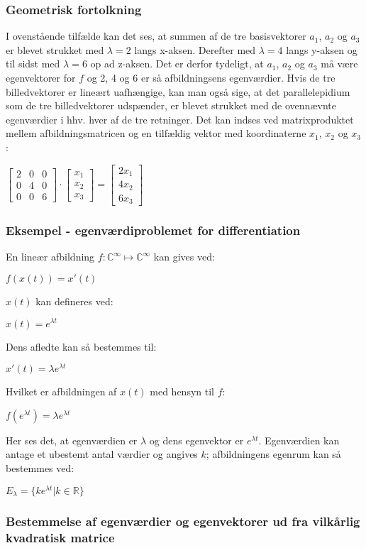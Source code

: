 \documentclass{article}
\newcommand{\cent}[1]{\begin{center}#1\end{center}}
\newcommand{\vek}[3]{\ensuremath{\begin{bmatrix} #1\\ #2\\ #3\end{bmatrix}}}
\newcommand{\mediumMatrix}[9]{\ensuremath{
		\begin{bmatrix}
			#1 & #2 & #3 \\
			#4 & #5 & #6 \\
			#7 & #8 & #9
		\end{bmatrix}}}
\begin{document}
	\subsubsection{Geometrisk fortolkning}
	I ovenstående tilfælde kan det ses, at summen af de tre basisvektorer $ a_1 $, $ a_2 $ og $ a_3 $ er blevet strukket med $\lambda=2$ langs x-aksen. Derefter med $\lambda=4$ langs y-aksen og til sidst med $\lambda=6$ op ad z-aksen. Det er derfor tydeligt, at $a_1$, $a_2$ og $a_3$ må være egenvektorer for $f$ og 2, 4 og 6 er så afbildningsens egenværdier.
	Hvis de tre billedvektorer er lineært uafhængige, kan man også sige, at det parallelepidium som de tre billedvektorer udspænder, er blevet strukket med de ovennævnte egenværdier i hhv. hver af de tre retninger. Det kan indses ved matrixproduktet mellem afbildningsmatricen og en tilfældig vektor med koordinaterne $x_1$, $x_2$ og $x_3$: 
	
	\cent{$ \mediumMatrix{2}{0}{0}{0}{4}{0}{0}{0}{6} \cdot \vek{x_1}{x_2}{x_3} = \vek{2x_1}{4x_2}{6x_3} $}
	
	\subsubsection{Eksempel - egenværdiproblemet for differentiation}
	
	En lineær afbildning $ f : \mathbb{C}^\infty \mapsto \mathbb{C}^\infty $ kan gives ved:
	
	\cent{$ f(x(t)) = x'(t) $}
	
	$x(t)$ kan defineres ved:
	
	\cent{$ x(t)= e^{\lambda t}$}
	
	Dens afledte kan så bestemmes til:
	
	\cent{$x'(t)=\lambda  e^{\lambda t}$}
	
	Hvilket er afbildningen af $ x(t) $ med hensyn til $ f $:
	
	\cent{$ f(e^{\lambda t}) = \lambda  e^{\lambda t} $}
	
	Her ses det, at egenværdien er $\lambda$ og dens egenvektor er $e^{\lambda t}$. Egenværdien kan antage et ubestemt antal værdier og angives $k$; afbildningens egenrum kan så bestemmes ved:
	
	\cent{$E_\lambda = \{ke^{\lambda t} | k \in \mathbb{R}\} $}
	
	\subsubsection{Bestemmelse af egenværdier og egenvektorer ud fra vilkårlig kvadratisk matrice}
	
\end{document}
